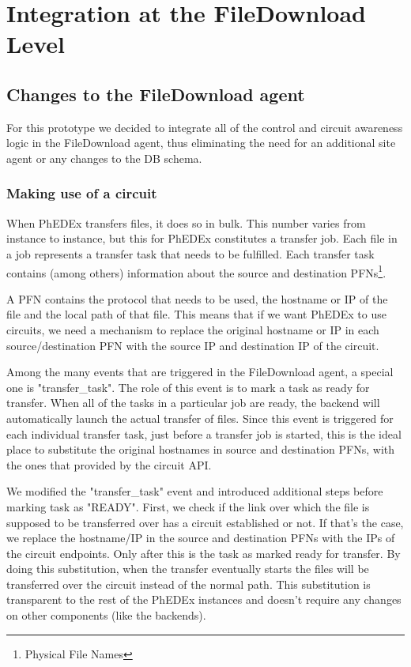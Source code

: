 \section{Integration at the FileDownload Level}

\subsection{Changes to the FileDownload agent}

For this prototype we decided to integrate all of the control and circuit awareness
logic in the FileDownload agent, thus eliminating the need for an additional site 
agent or any changes to the DB schema.

\subsubsection{Making use of a circuit}

When PhEDEx transfers files, it does so in bulk. This number varies from instance
to instance, but this for PhEDEx constitutes a transfer job. Each file in a job
represents a transfer task that needs to be fulfilled. Each transfer task contains
(among others) information about the source and destination PFNs\footnote{Physical File Names}.

A PFN contains the protocol that needs to be used, the hostname or IP of the file
and the local path of that file. This means that if we want PhEDEx to use
circuits, we need a mechanism to replace the original hostname or IP in each 
source/destination PFN with the source IP and destination IP of the circuit.

Among the many events that are triggered in the FileDownload agent, a special one 
is "transfer\_task". The role of this event is to mark a task as ready for transfer. 
When all of the tasks in a particular job are ready, the backend will automatically 
launch the actual transfer of files. Since this event is triggered for each individual
transfer task, just before a transfer job is started, this is the ideal place to
substitute the original hostnames in source and destination PFNs, with the ones
that provided by the circuit API.

We modified the "transfer\_task" event and introduced additional steps before
marking task as "READY". First, we check if the link over which the file is
supposed to be transferred over has a circuit established or not. If that's the
case, we replace the hostname/IP in the source and destination PFNs with the
IPs of the circuit endpoints. Only after this is the task as marked ready for
transfer. By doing this substitution, when the transfer eventually starts
the files will be transferred over the circuit instead of the normal path. This
substitution is transparent to the rest of the PhEDEx instances and doesn't 
require any changes on other components (like the backends).

